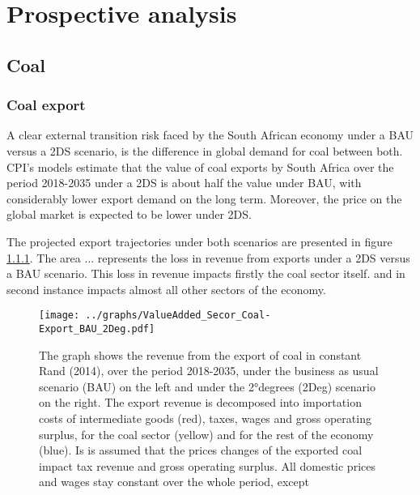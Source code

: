 \documentclass[12pt,english]{article}
\begin{document}
\citep{von2016energy}


\section{Prospective analysis}

\subsection{Coal}

\subsubsection{Coal export}

A clear external transition risk faced by the South African economy under a BAU versus a 2DS scenario, is the difference in global demand for coal between both. CPI's models estimate that the value of coal exports by South Africa over the period 2018-2035 under a 2DS is about half the value under BAU, with considerably lower export demand on the long term. Moreover, the price on the global market is expected to be lower under 2DS. 

The projected export trajectories under both scenarios are presented in figure \ref{}. The area ... represents the loss in revenue from exports under a 2DS versus a BAU scenario. This loss in revenue impacts firstly the coal sector itself.  and in second instance impacts almost all other sectors of the economy. 


\begin{figure}[!h]
	\hspace{-10pt}\texttt{[image: ../graphs/ValueAdded\_Secor\_Coal-Export\_BAU\_2Deg.pdf]}
	\caption{\label{ExportRevenue_Decomposition_Diff}\small The graph shows the revenue from the export of coal in constant Rand (2014), over the period 2018-2035, under the business as usual scenario (BAU) on the left and under the 2°degrees (2Deg) scenario on the right. The export revenue is decomposed into importation costs of intermediate goods (red), taxes, wages and gross operating surplus, for the coal sector (yellow) and for the rest of the economy (blue). Is is assumed that the prices changes of the exported coal impact tax revenue and gross operating surplus. All domestic prices and wages stay constant over the whole period, except  }
\end{figure}
\end{document}
